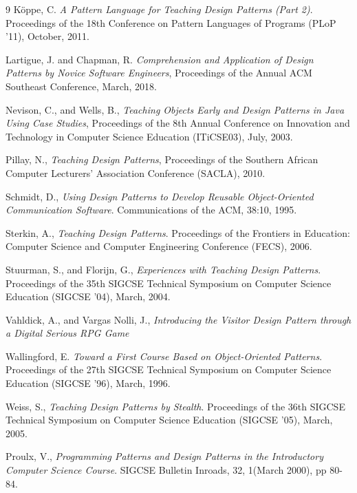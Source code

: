 \documentclass[conference]{IEEEtran}
\begin{document}
\begin{thebibliography}{9}
Köppe, C.
\emph{A Pattern Language for Teaching Design Patterns (Part 2)}.
Proceedings of the 18th Conference on Pattern Languages of Programs (PLoP '11), October, 2011.

Lartigue, J. and Chapman, R.
\emph{Comprehension and Application of Design Patterns by Novice Software Engineers},
Proceedings of the Annual ACM Southeast Conference, March, 2018.

Nevison, C., and Wells, B., 
\emph{Teaching Objects Early and Design Patterns in Java Using Case Studies},
Proceedings of the 8th Annual Conference on Innovation and Technology in Computer Science Education (ITiCSE03), July, 2003.

Pillay, N.,
\emph{Teaching Design Patterns},
Proceedings of the Southern African Computer Lecturers' Association Conference (SACLA), 2010.

Schmidt, D.,
\emph{Using Design Patterns to Develop Reusable Object-Oriented Communication Software}.
Communications of the ACM, 38:10, 1995.

Sterkin, A.,
\emph{Teaching Design Patterns}.
Proceedings of the Frontiers in Education: Computer Science and Computer Engineering Conference (FECS), 2006.

Stuurman, S., and Florijn, G.,
\emph{Experiences with Teaching Design Patterns}.
Proceedings of the 35th SIGCSE Technical Symposium on Computer Science Education (SIGCSE '04), March, 2004.

Vahldick, A., and Vargas Nolli, J.,
\emph{Introducing the Visitor Design Pattern through a Digital Serious RPG Game}

Wallingford, E.
\emph{Toward a First Course Based on Object-Oriented Patterns}.
Proceedings of the 27th SIGCSE Technical Symposium on Computer Science Education (SIGCSE '96), March, 1996.

Weiss, S.,
\emph{Teaching Design Patterns by Stealth}.
Proceedings of the 36th SIGCSE Technical Symposium on Computer Science Education (SIGCSE ’05), March, 2005.

Proulx, V.,
\emph{Programming Patterns and Design Patterns in the Introductory Computer Science Course}.
SIGCSE Bulletin Inroads, 32, 1(March 2000), pp 80-84.

\end{thebibliography}
\end{document}
